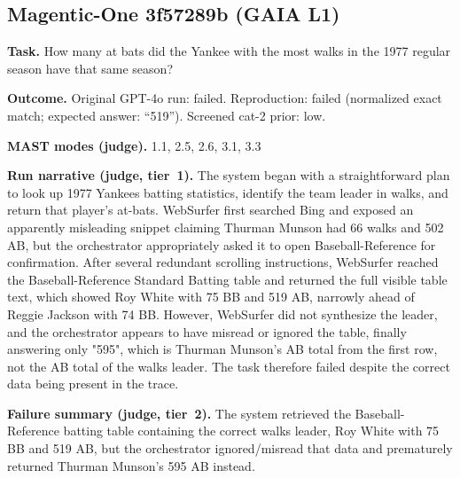 \subsection*{Magentic-One 3f57289b (GAIA L1)}
\textbf{Task.} How many at bats did the Yankee with the most walks in the 1977 regular season have that same season?

\textbf{Outcome.} Original GPT-4o run: failed. Reproduction: failed (normalized exact match; expected answer: ``519''). Screened cat-2 prior: low.

\textbf{MAST modes (judge).} 1.1, 2.5, 2.6, 3.1, 3.3

\textbf{Run narrative (judge, tier~1).} The system began with a straightforward plan to look up 1977 Yankees batting statistics, identify the team leader in walks, and return that player's at-bats. WebSurfer first searched Bing and exposed an apparently misleading snippet claiming Thurman Munson had 66 walks and 502 AB, but the orchestrator appropriately asked it to open Baseball-Reference for confirmation. After several redundant scrolling instructions, WebSurfer reached the Baseball-Reference Standard Batting table and returned the full visible table text, which showed Roy White with 75 BB and 519 AB, narrowly ahead of Reggie Jackson with 74 BB. However, WebSurfer did not synthesize the leader, and the orchestrator appears to have misread or ignored the table, finally answering only "595", which is Thurman Munson's AB total from the first row, not the AB total of the walks leader. The task therefore failed despite the correct data being present in the trace.

\textbf{Failure summary (judge, tier~2).} The system retrieved the Baseball-Reference batting table containing the correct walks leader, Roy White with 75 BB and 519 AB, but the orchestrator ignored/misread that data and prematurely returned Thurman Munson's 595 AB instead.

